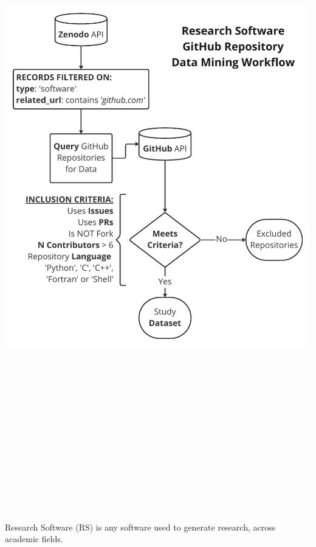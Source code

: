 \documentclass[25pt, a0paper, landscape, margin=10mm, innermargin=15mm, blockverticalspace=10mm, subcolspace=7mm, dvipsnames]{tikzposter} %
\begin{document}
\begin{columns}
{\begin{multicols}{2}
{\begin{tikzfigure}
            \includegraphics[height=290mm]{Figures/epccposter - DataMiningWorkflow.pdf}
        \end{tikzfigure}
        \columnbreak
        Research Software (RS) is any software used to generate research, across academic fields. 
        \vspace{1em}
        
}
\end{multicols}}
\end{columns}
\end{document}
